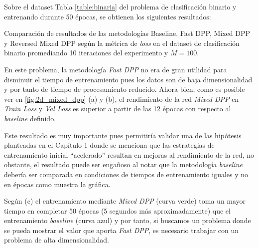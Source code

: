 \vspace{0.2cm}

Sobre el dataset Tabla \ref{table:binaria} del problema de clasificación binario y entrenando durante 50 épocas, se obtienen los siguientes resultados: 


\begin{images}[\label{fig:2d_mixed_dpp}]{\centering Comparación de resultados de las metodologías Baseline, Fast DPP, Mixed DPP y Reversed Mixed DPP según la métrica de \textit{loss} en el dataset de clasificación binario promediando 10 iteraciones del experimento y $M=100$.}

\end{images}

En este problema, la metodología \textit{Fast DPP} no era de gran utilidad para disminuir el tiempo de entrenamiento pues los datos son de baja dimensionalidad y por tanto de tiempo de procesamiento reducido. Ahora bien, como es posible ver en \ref{fig:2d_mixed_dpp} (a) y (b), el rendimiento de la red \textit{Mixed DPP} en \textit{Train Loss} y \textit{Val Loss} es superior a partir de las 12 épocas con respecto al \textit{baseline} definido. 

\vspace{0.2cm}

Este resultado es muy importante pues permitiría validar una de las hipótesis planteadas en el Capítulo 1 donde se menciona que las estrategias de entrenamiento inicial ``acelerado'' resultan en mejoras al rendimiento de la red, no obstante, el resultado puede ser engañoso al notar que la metodología \textit{baseline} debería ser comparada en condiciones de tiempos de entrenamiento iguales y no en épocas como muestra la gráfica. 

\vspace{0.2cm}

Según (c) el entrenamiento mediante \textit{Mixed DPP} (curva verde) toma un mayor tiempo en completar 50 épocas (5 segundos más aproximadamente) que el entrenamiento \textit{baseline} (curva azul) y por tanto, si buscamos un problema donde se pueda mostrar el valor que aporta \textit{Fast DPP}, es necesario trabajar con un problema de alta dimensionalidad. 

